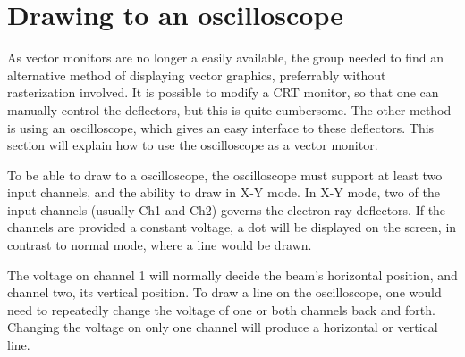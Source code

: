 \section{Drawing to an oscilloscope}
As vector monitors are no longer a easily available, the group needed to find an alternative method of displaying vector graphics, preferrably without rasterization involved.
It is possible to modify a CRT monitor, so that one can manually control the deflectors, but this is quite cumbersome.
The other method is using an oscilloscope, which gives an easy interface to these deflectors.
This section will explain how to use the oscilloscope as a vector monitor.


To be able to draw to a oscilloscope, the oscilloscope must support at least two input channels, and the ability to draw in X-Y mode.
In X-Y mode, two of the input channels (usually Ch1 and Ch2) governs the electron ray deflectors.
If the channels are provided a constant voltage, a dot will be displayed on the screen, in contrast to normal mode, where  a line would be drawn.

The voltage on channel 1 will normally decide the beam's horizontal position, and channel two, its vertical position.
To draw a line on the oscilloscope, one would need to repeatedly change the voltage of one or both channels back and forth.
Changing the voltage on only one channel will produce a horizontal or vertical line. 

